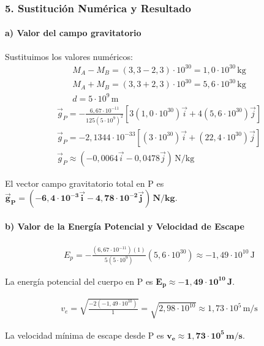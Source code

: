 \subsubsection*{5. Sustitución Numérica y Resultado}
\paragraph*{a) Valor del campo gravitatorio}
Sustituimos los valores numéricos:
\begin{gather}
    M_A - M_B = (3,3 - 2,3) \cdot 10^{30} = 1,0 \cdot 10^{30} \, \text{kg} \\
    M_A + M_B = (3,3 + 2,3) \cdot 10^{30} = 5,6 \cdot 10^{30} \, \text{kg} \\
    d = 5 \cdot 10^9 \, \text{m}
\end{gather}
\begin{gather}
    \vec{g}_P = -\frac{6,67 \cdot 10^{-11}}{125(5 \cdot 10^9)^2} \left[ 3(1,0 \cdot 10^{30})\vec{i} + 4(5,6 \cdot 10^{30})\vec{j} \right] \nonumber \\
    \vec{g}_P = -2,1344 \cdot 10^{-33} \left[ (3 \cdot 10^{30})\vec{i} + (22,4 \cdot 10^{30})\vec{j} \right] \nonumber \\
    \vec{g}_P \approx (-0,0064\vec{i} - 0,0478\vec{j}) \, \text{N/kg}
\end{gather}
\begin{cajaresultado}
    El vector campo gravitatorio total en P es $\boldsymbol{\vec{g}_P = (-6,4 \cdot 10^{-3}\vec{i} - 4,78 \cdot 10^{-2}\vec{j}) \, \textbf{N/kg}}$.
\end{cajaresultado}

\paragraph*{b) Valor de la Energía Potencial y Velocidad de Escape}
\begin{gather}
    E_p = -\frac{(6,67 \cdot 10^{-11})(1)}{5(5 \cdot 10^9)}(5,6 \cdot 10^{30}) \approx -1,49 \cdot 10^{10} \, \text{J}
\end{gather}
\begin{cajaresultado}
    La energía potencial del cuerpo en P es $\boldsymbol{E_p \approx -1,49 \cdot 10^{10} \, \textbf{J}}$.
\end{cajaresultado}
\medskip
\begin{gather}
    v_e = \sqrt{\frac{-2(-1,49 \cdot 10^{10})}{1}} = \sqrt{2,98 \cdot 10^{10}} \approx 1,73 \cdot 10^5 \, \text{m/s}
\end{gather}
\begin{cajaresultado}
    La velocidad mínima de escape desde P es $\boldsymbol{v_e \approx 1,73 \cdot 10^5 \, \textbf{m/s}}$.
\end{cajaresultado}

